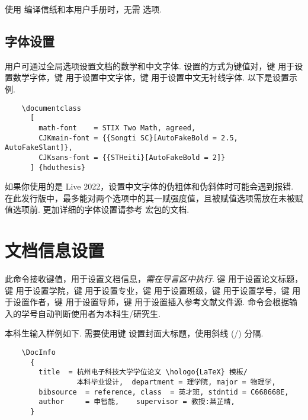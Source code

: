 使用  编译信纸和本用户手册时，无需  选项.

\subsection{字体设置}

用户可通过全局选项设置文档的数学和中文字体. 设置的方式为键值对，键  用于设置数学字体，键  用于设置中文字体，键  用于设置中文无衬线字体. 以下是设置示例.

\begin{framed}
  \begin{verbatim}
    \documentclass
      [
        math-font    = STIX Two Math, agreed,
        CJKmain-font = {{Songti SC}[AutoFakeBold = 2.5, AutoFakeSlant]},
        CJKsans-font = {{STHeiti}[AutoFakeBold = 2]}
      ] {hduthesis}
  \end{verbatim}
\end{framed}

如果你使用的是  Live 2022，设置中文字体的伪粗体和伪斜体时可能会遇到报错.
在此发行版中，最多能对两个选项中的其一赋强度值，且被赋值选项需放在未被赋值选项前. 更加详细的字体设置请参考  宏包的文档.

\section{文档信息设置}

\begin{function}{\DocInfo}
  \begin{syntax}
  \end{syntax}

  此命令接收键值，用于设置文档信息，\emph{需在导言区中执行}. 键  用于设置论文标题，键  用于设置学院，键  用于设置专业，键  用于设置班级，键  用于设置学号，键  用于设置作者，键  用于设置导师，键  用于设置插入参考文献文件源. 命令会根据输入的学号自动判断使用者为本科生/研究生.
\end{function}

本科生输入样例如下. 需要使用键  设置封面大标题，使用斜线 (/) 分隔.

\begin{framed}
  \begin{verbatim}
    \DocInfo
      {
        title  = 杭州电子科技大学学位论文 \hologo{LaTeX} 模板/
                 本科毕业设计,  department = 理学院, major = 物理学,
        bibsource  = reference, class  = 英才班, stdntid = C668668E,
        author     = 申智能,    supervisor = 教授:葉芷晴, 
      }
  \end{verbatim}
\end{framed}

